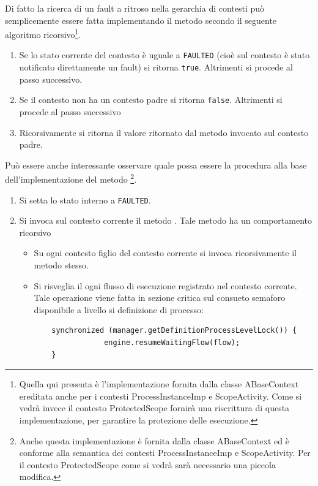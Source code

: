 Di fatto la ricerca di un fault a ritroso nella gerarchia di contesti può
semplicemente essere fatta implementando il metodo 
secondo il seguente algoritmo ricorsivo\footnote{Quella qui presenta \`e
l'implementazione fornita dalla classe ABaseContext ereditata anche per i
contesti ProcessInstanceImp e ScopeActivity. Come si vedrà invece il contesto
ProtectedScope fornirà una riscrittura di questa implementazione, per garantire
la protezione delle esecuzione.}.

\begin{enumerate}
  \item Se lo stato corrente del contesto \`e uguale a \texttt{FAULTED} (cioè
  sul contesto \`e stato notificato direttamente un fault) si ritorna
  \texttt{true}. Altrimenti si procede al passo successivo.
  \item Se il contesto non ha un contesto padre si ritorna \texttt{false}.
  Altrimenti si procede al passo successivo
  \item Ricorsivamente si ritorna il valore ritornato dal metodo 
   invocato sul contesto padre.
\end{enumerate}

Può essere anche interessante osservare quale possa essere la procedura alla
base dell'implementazione del metodo \footnote{Anche questa implementazione \`e fornita dalla classe ABaseContext ed \`e conforme
alla semantica dei contesti ProcessInstanceImp e ScopeActivity. Per il contesto
ProtectedScope come si vedrà sarà necessario una piccola modifica.}.

\begin{enumerate}
  \item Si setta lo stato interno a \texttt{FAULTED}.
  \item Si invoca sul contesto corrente il metodo .
  Tale metodo ha un comportamento ricorsivo
  \begin{itemize}
  	\item  Su ogni contesto figlio del contesto corrente si invoca ricorsivamente
  	il metodo  stesso.
  	\item Si risveglia il ogni flusso di esecuzione registrato nel contesto
  	corrente. Tale operazione viene fatta in sezione critica sul consueto
  	semaforo disponibile a livello si definizione di processo:
	\lstset{frame=NONE}  	
	\begin{lstlisting}
	synchronized (manager.getDefinitionProcessLevelLock()) {
                engine.resumeWaitingFlow(flow);
    }
  	\end{lstlisting}	  	 
  \end{itemize}
\end{enumerate}


